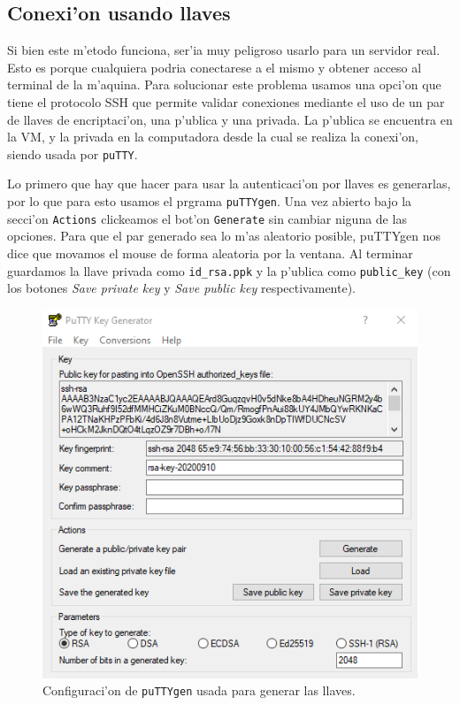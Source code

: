 \documentclass[11pt]{article}
\begin{document}
	\subsection{Conexi'on usando llaves}
		Si bien este m'etodo funciona, ser'ia muy peligroso usarlo para un servidor real. Esto es porque cualquiera podria conectarese a el mismo y obtener acceso al terminal de la m'aquina. Para solucionar este problema usamos una opci'on que tiene el protocolo SSH que permite validar conexiones mediante el uso de un par de llaves de encriptaci'on, una p'ublica y una privada. La p'ublica se encuentra en la VM, y la privada en la computadora desde la cual se realiza la conexi'on, siendo usada por \texttt{puTTY}.
		
		Lo primero que hay que hacer para usar la autenticaci'on por llaves es generarlas, por lo que para esto usamos el prgrama \texttt{puTTYgen}. Una vez abierto bajo la secci'on \texttt{Actions} clickeamos el bot'on \texttt{Generate} sin cambiar niguna de las opciones. Para que el par generado sea lo m'as aleatorio posible, puTTYgen nos dice que movamos el mouse de forma aleatoria por la ventana. Al terminar guardamos la llave privada como \texttt{id\_rsa.ppk} y la p'ublica como \texttt{public\_key} (con los botones \textit{Save private key} y \textit{Save public key} respectivamente).
		
		\begin{figure}[H]
    			\centering
    			\includegraphics[scale=0.9]{Images/Connection/puTTYgen.PNG}
    			\caption{Configuraci'on de \texttt{puTTYgen} usada para generar las llaves.}
    			\label{fig:puTTYgen}
		\end{figure}
		
\end{document}
